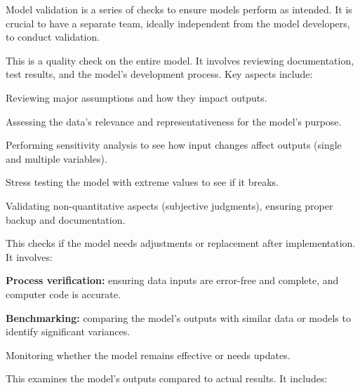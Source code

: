 
\begin{orkeybox}
Model validation is a series of checks to ensure models perform as intended. It
is crucial to have a separate team, ideally independent from the model
developers, to conduct validation.
\end{orkeybox}


This is a quality check on the entire model. It involves reviewing documentation,
test results, and the model's development process. Key aspects include:

\begin{lettered}
\item Reviewing major assumptions and how they impact outputs.
\item Assessing the data's relevance and representativeness for the model's
purpose.
\item Performing sensitivity analysis to see how input changes affect outputs
(single and multiple variables).
\item Stress testing the model with extreme values to see if it breaks.
\item Validating non-quantitative aspects (subjective judgments), ensuring proper
backup and documentation.
\end{lettered}


This checks if the model needs adjustments or replacement after implementation.
It involves:

\begin{lettered}
\item \textbf{Process verification:} ensuring data inputs are error-free and
complete, and computer code is accurate.
\item \textbf{Benchmarking:} comparing the model's outputs with similar data or
models to identify significant variances.
\item Monitoring whether the model remains effective or needs updates.
\end{lettered}


This examines the model's outputs compared to actual results. It includes:

